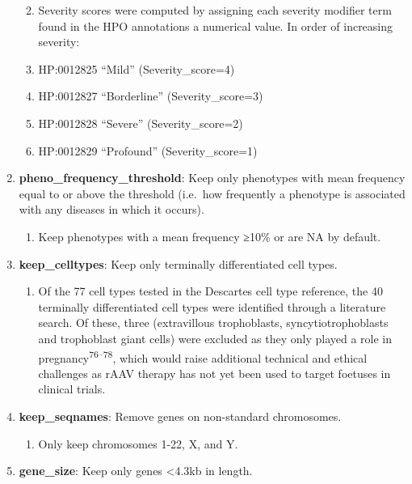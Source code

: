 \documentclass[
sn-nature
]{sn-jnl}
\providecommand{\tightlist}{%
  \setlength{\itemsep}{0pt}\setlength{\parskip}{0pt}}\usepackage{longtable,booktabs,array}
\begin{document}
\begin{enumerate}
  \begin{enumerate}
  \def\labelenumii{\arabic{enumii}.}
  \item
    Severity scores were computed by assigning each severity modifier
    term found in the HPO annotations a numerical value. In order of
    increasing severity:
  \item
    HP:0012825 ``Mild'' (Severity\_score=4)
  \item
    HP:0012827 ``Borderline'' (Severity\_score=3)
  \item
    HP:0012828 ``Severe'' (Severity\_score=2)
  \item
    HP:0012829 ``Profound'' (Severity\_score=1)
  \end{enumerate}
\item
  \textbf{pheno\_frequency\_threshold}: Keep only phenotypes with mean
  frequency equal to or above the threshold (i.e.~how frequently a
  phenotype is associated with any diseases in which it occurs).

  \begin{enumerate}
  \def\labelenumii{\arabic{enumii}.}
  \tightlist
  \item
    Keep phenotypes with a mean frequency ≥10\% or are NA by default.
  \end{enumerate}
\item
  \textbf{keep\_celltypes}: Keep only terminally differentiated cell
  types.

  \begin{enumerate}
  \def\labelenumii{\arabic{enumii}.}
  \tightlist
  \item
    Of the 77 cell types tested in the Descartes cell type reference,
    the 40 terminally differentiated cell types were identified through
    a literature search. Of these, three (extravillous trophoblasts,
    syncytiotrophoblasts and trophoblast giant cells) were excluded as
    they only played a role in pregnancy\textsuperscript{76--78}, which
    would raise additional technical and ethical challenges as rAAV
    therapy has not yet been used to target foetuses in clinical trials.
  \end{enumerate}
\item
  \textbf{keep\_seqnames}: Remove genes on non-standard chromosomes.

  \begin{enumerate}
  \def\labelenumii{\arabic{enumii}.}
  \tightlist
  \item
    Only keep chromosomes 1-22, X, and Y.
  \end{enumerate}
\item
  \textbf{gene\_size}: Keep only genes \textless4.3kb in length.


\end{enumerate}
\end{document}
